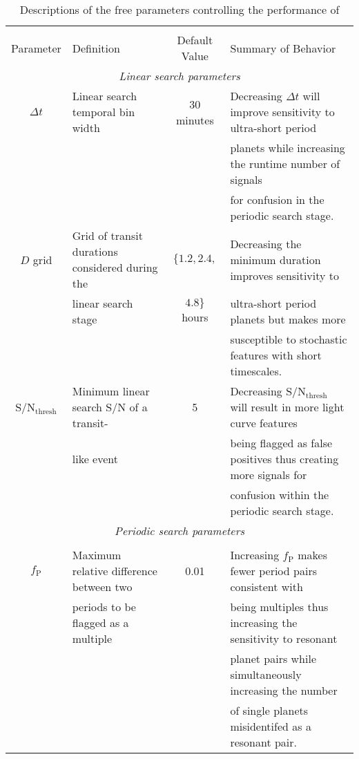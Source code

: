 \clearpage
\begin{landscape}
\begin{table*}
  \small
  \renewcommand{\arraystretch}{0.7}
  \caption{Descriptions of the free parameters controlling the performance of \pipeline{}}
  \label{oriontable:freeparams}
  \begin{tabular}{clcl}
    \hline \\ [-1ex]
    Parameter & Definition & Default Value & Summary of Behavior \\
    \hline
    \multicolumn{4}{c}{\emph{Linear search parameters}} \\
    \hline
    $\Delta t$ & Linear search temporal bin width & 30 minutes &
    Decreasing $\Delta t$ will improve sensitivity to ultra-short period \\
    &&& planets while increasing the \pipeline{} runtime number of signals \\
    &&& for confusion in the periodic search stage. \\ 
    $D$ grid & Grid of transit durations considered during the & $\{1.2,2.4,$ &
    Decreasing the minimum duration improves sensitivity to \\
    & linear search stage & $4.8\}$ hours &
    ultra-short period planets but makes \pipeline{} more \\
    &&& susceptible to stochastic features with short timescales. \\ 
    S/N$_{\text{thresh}}$ & Minimum linear search S/N of a transit- & 5 &
    Decreasing S/N$_{\text{thresh}}$ will result in more light curve features \\
    & like event &&
    being flagged as false positives thus creating more signals for \\
    &&& confusion within the periodic search stage.  \\
    \multicolumn{4}{c}{\emph{Periodic search parameters}} \\
    \hline \\
    $f_{\text{P}}$ & Maximum relative difference between two  & 0.01 &
    Increasing $f_{\text{P}}$ makes fewer period pairs consistent with  \\
    & periods to be flagged as a multiple &&
    being multiples thus increasing the sensitivity to resonant \\
    &&& planet pairs while simultaneously increasing the number \\
    &&& of single planets misidentifed as a resonant pair.  \\

\end{tabular}
\end{table*}
\end{landscape}
